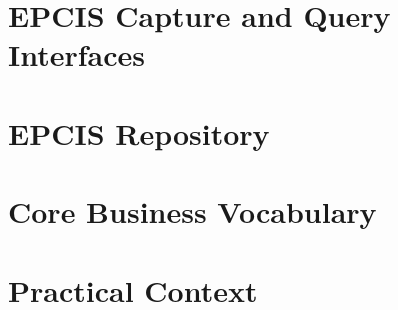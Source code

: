 \section{EPCIS Capture and Query Interfaces}

\section{EPCIS Repository}

\section{Core Business Vocabulary}

\section{Practical Context}


\cleardoublepage